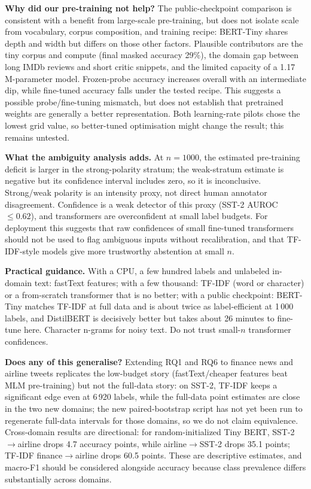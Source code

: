 \documentclass[11pt,a4paper]{article}
\begin{document}
\textbf{Why did our pre-training not help?} The public-checkpoint comparison is consistent with a benefit from large-scale pre-training, but does not isolate scale from vocabulary, corpus composition, and training recipe: BERT-Tiny shares depth and width but differs on those other factors.
Plausible contributors are the tiny corpus and compute (final masked accuracy 29\%), the domain gap between long IMDb reviews and short critic snippets, and the limited capacity of a 1.17\,M-parameter model. Frozen-probe accuracy increases overall with an intermediate dip, while fine-tuned accuracy falls under the tested recipe. This suggests a possible probe/fine-tuning mismatch, but does not establish that pretrained weights are generally a better representation. Both learning-rate pilots chose the lowest grid value, so better-tuned optimisation might change the result; this remains untested.

\textbf{What the ambiguity analysis adds.} At $n=1000$, the estimated pre-training deficit is larger in the strong-polarity stratum; the weak-stratum estimate is negative but its confidence interval includes zero, so it is inconclusive. Strong/weak polarity is an intensity proxy, not direct human annotator disagreement. Confidence is a weak detector of this proxy (SST-2 AUROC $\le0.62$), and transformers are overconfident at small label budgets.
For deployment this suggests that raw confidences of small fine-tuned transformers should not be used to flag ambiguous inputs without recalibration, and that TF-IDF-style models give more trustworthy abstention at small $n$.

\textbf{Practical guidance.} With a CPU, a few hundred labels and unlabeled in-domain text: fastText features; with a few thousand: TF-IDF (word or character) or a from-scratch transformer that is no better; with a public checkpoint: BERT-Tiny matches TF-IDF at full data and is about twice as label-efficient at 1\,000 labels, and DistilBERT is decisively better but takes about 26 minutes to fine-tune here. Character n-grams for noisy text. Do not trust small-$n$ transformer confidences.

\textbf{Does any of this generalise?} Extending RQ1 and RQ6 to finance news and airline tweets replicates the low-budget story (fastText/cheaper features beat MLM pre-training) but not the full-data story: on SST-2, TF-IDF keeps a significant edge even at 6\,920 labels, while the full-data point estimates are close in the two new domains; the new paired-bootstrap script has not yet been run to regenerate full-data intervals for those domains, so we do not claim equivalence. Cross-domain results are directional: for random-initialized Tiny BERT, SST-2$\to$airline drops 4.7 accuracy points, while airline$\to$SST-2 drops 35.1 points; TF-IDF finance$\to$airline drops 60.5 points. These are descriptive estimates, and macro-F1 should be considered alongside accuracy because class prevalence differs substantially across domains.
\end{document}
